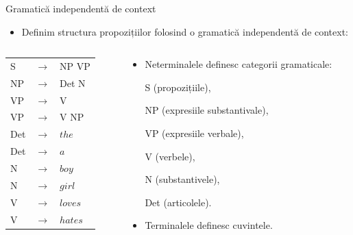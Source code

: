 \documentclass[xcolor=x11names,compress,10pt]{beamer}
\begin{document}
\begin{frame}{Gramatică  independentă de context}

\begin{itemize}
\item Definim structura propozițiilor folosind o 
gramatică independentă de context:
\end{itemize}
\bigskip

\begin{columns}
\begin{column}{0.35\textwidth}
\begin{tabular}{lcl}
S &$\to$ & NP VP \\
NP &$\to$ &Det N \\
VP &$\to$ & V\\
VP &$\to$ & V NP\\
Det &$\to$ & $the$\\
Det &$\to$ & $a$\\
N &$\to$ & $boy$\\
N &$\to$ & $girl$\\
V &$\to$ & $loves$\\
V &$\to$ & $hates$ 
\end{tabular}
\end{column}
\begin{column}{0.6\textwidth}
\begin{itemize}
\item Neterminalele definesc categorii gramaticale:
\medskip

S (propozițiile),

NP (expresiile substantivale), 

VP (expresiile verbale),

V (verbele), 

N (substantivele), 

Det (articolele).


\item  Terminalele  definesc cuvintele.
\end{itemize}
\end{column}
\end{columns}
\end{frame}
\end{document}
